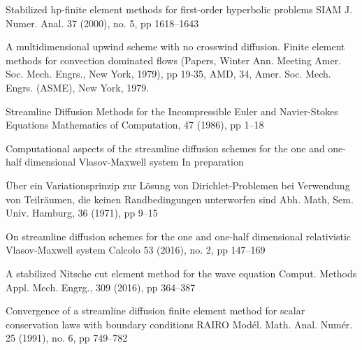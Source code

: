 \documentclass[reqno,a4paper]{amsart}
\theoremstyle{remark}
\numberwithin{equation}{section}
\begin{document}
\begin{thebibliography}{9999}
{Stabilized hp-finite element methods for first-order hyperbolic problems}
{ SIAM J. Numer. Anal. 37 (2000), no. 5, pp 1618--1643} 

{A multidimensional upwind scheme with no crosswind diffusion. Finite element methods for convection dominated flows} 
{(Papers, Winter Ann. Meeting Amer. Soc. Mech. Engrs., New York, 1979), pp 19-35, AMD, 34, Amer. Soc. Mech. Engrs. (ASME), New York, 1979.}


{Streamline Diffusion Methods for the Incompressible Euler and Navier-Stokes Equations}
{Mathematics of Computation, 47 (1986), pp 1--18}


{Computational aspects of the streamline diffusion schemes for the one 
and one-half dimensional Vlasov-Maxwell system}
{In preparation}

{\"{U}ber ein Variationsprinzip zur L\"{o}sung von Dirichlet-Problemen
bei Verwendung von Teilr\"{a}umen, die keinen Randbedingungen unterworfen sind}
{Abh. Math, Sem. Univ. Hamburg, 36 (1971), pp 9--15}

{On streamline diffusion schemes for the one and one-half dimensional relativistic Vlasov-Maxwell system} {Calcolo 53 (2016), no. 2, pp 147--169}

{A stabilized Nitsche cut element method for the wave equation}
{Comput. Methods Appl. Mech. Engrg., 309 (2016), pp 364--387}

{Convergence of a streamline diffusion finite element method for scalar conservation laws with boundary conditions}{ RAIRO Modél. Math. Anal. Numér. 25 (1991), no. 6, pp 749--782}



\end{thebibliography}
\end{document}

